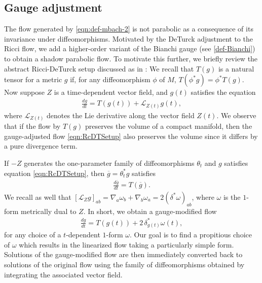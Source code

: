 \documentclass[10pt,reqno]{amsart}
\newcommand{\gbar}{\overline{g}}
\begin{document}
\subsection{Gauge adjustment}
\label{subsec:gauge_adj}

The flow generated by \eqref{eqn:def-mbach-2} is not parabolic as a consequence of its invariance under diffeomorphisms. Motivated by the DeTurck adjustment to the Ricci flow, we 
add a higher-order variant of the Bianchi gauge (see \eqref{def-Bianchi}) to obtain a shadow parabolic flow. To motivate this further, we briefly review the abstract Ricci-DeTurck 
setup discussed as in \cite{BH1}:  We recall that $T(g)$ is a natural tensor for a metric $g$ if, for any diffeomorphism $\phi$ of $M$, $T(\phi^* g) = \phi^*T(g)$. Now suppose $Z$ is a 
time-dependent vector field, and $g(t)$ satisfies the equation  
\begin{align}
\label{eqn:RcDTSetup}
\frac{dg}{dt} = T(g(t)) + \mathcal{L}_{Z(t)} g(t),
\end{align}
where $\mathcal{L}_{Z(t)}$ denotes the Lie derivative along the vector field $Z(t).$ We observe that if the flow by $T(g)$ preserves the volume of a compact manifold, then the 
gauge-adjusted flow \eqref{eqn:RcDTSetup} also preserves the volume since it differs by a pure divergence term.

If $-Z$ generates the one-parameter family of diffeomorphisms $\theta_t$ and $g$ satisfies equation \eqref{eqn:RcDTSetup}, then $\gbar = \theta_t^* g$ satisfies 
\begin{align} \label{eqn:abs-eqn}
\frac{d\gbar}{dt} = T(\gbar).
\end{align}
We recall as well that $[\mathcal{L}_Z g]_{ab} = \nabla_a \omega_b + \nabla_b \omega_a = 2 (\delta^* \omega)_{ab}$, where
$\omega$ is the $1$-form metrically dual to $Z$. In short, we obtain a gauge-modified flow
\begin{align} \label{eqn:abs-mod-eqn}
\frac{d g}{dt} = T(g(t)) + 2 \, \delta_{g(t)}^* \omega(t),
\end{align}
for any choice of a $t$-dependent $1$-form $\omega$.  Our goal is to find a propitious choice of $\omega$ which results in the linearized flow taking a particularly simple form.  Solutions of the gauge-modified flow are then immediately converted back to solutions of the original flow using the family of
diffeomorphisms obtained by integrating the associated vector field. 

\
\end{document}
